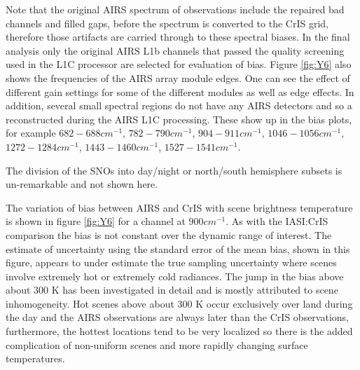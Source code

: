 \documentclass[11pt]{article}
\begin{document}


Note that the original AIRS spectrum of observations include the repaired bad channels and filled gaps, before the spectrum is converted to the CrIS grid, therefore those artifacts are carried through to these spectral biases. In the final analysis only the original AIRS L1b channels that passed the quality screening used in the L1C processor are selected for evaluation of bias. Figure \ref{fig:Y6} also shows the frequencies of the AIRS array module edges. One can see the effect of different gain settings for some of the different modules as well as edge effects. In addition, several small spectral regions do not have any AIRS detectors and so a reconstructed during the AIRS L1C processing. These show up in the bias plots, for example $ 682 - 688 cm^{-1} $, $ 782 - 790 cm^{-1} $, $ 904 - 911 cm^{-1} $, $ 1046 - 1056 cm^{-1} $, $ 1272 - 1284 cm^{-1} $, $ 1443 - 1460 cm^{-1} $, $ 1527 - 1541 cm^{-1} $.

The division of the SNOs into day/night or north/south hemisphere subsets is un-remarkable and not shown here.

The variation of bias between AIRS and CrIS with scene brightness temperature is shown in figure \ref{fig:Y6} for a channel at $ 900 cm^{-1} $. As with the IASI:CrIS comparison the bias is not constant over the dynamic range of interest. The estimate of uncertainty using the standard error of the mean bias, shown in this figure, appears to under estimate the true sampling uncertainty where scenes involve extremely hot or extremely cold radiances. The jump in the bias above about 300 K has been investigated in detail and is mostly attributed to scene inhomogeneity. Hot scenes above about 300 K occur exclusively over land during the day and the AIRS observations are always later than the CrIS observations, furthermore, the hottest locations tend to be very localized so there is the added complication of non-uniform scenes and more rapidly changing surface temperatures.
\end{document}
